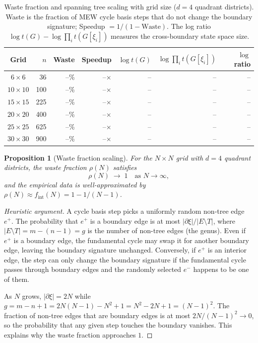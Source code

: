 \documentclass[11pt]{article}
\newtheorem{proposition}{Proposition}[section]
\begin{document}
\begin{table}[H]
\centering
\begin{tabular}{crrrrrr}
\toprule
Grid & $n$ & Waste & Speedup & $\log t(G)$ & $\log \prod_i t(G[\xi_i])$ & $\log$ ratio \\
\midrule
$6 \times 6$   &   36 & --\% &  --$\times$ &  -- & -- & -- \\
$10 \times 10$ &  100 & --\% &  --$\times$ &  -- & -- & -- \\
$15 \times 15$ &  225 & --\% &  --$\times$ &  -- & -- & -- \\
$20 \times 20$ &  400 & --\% &  --$\times$ &  -- & -- & -- \\
$25 \times 25$ &  625 & --\% &  --$\times$ &  -- & -- & -- \\
$30 \times 30$ &  900 & --\% &  --$\times$ &  -- & -- & -- \\
\bottomrule
\end{tabular}
\caption{Waste fraction and spanning tree scaling with grid size ($d = 4$ quadrant
districts). Waste is the fraction of MEW cycle basis steps that do not change the
boundary signature; Speedup $= 1/(1-\text{Waste})$. The log ratio
$\log t(G) - \log \prod_i t(G[\xi_i])$ measures the cross-boundary state space
size.}\label{tab:scaling}
\end{table}

\begin{proposition}[Waste fraction scaling]\label{prop:waste-scaling}
For the $N \times N$ grid with $d = 4$ quadrant districts, the waste fraction
$\rho(N)$ satisfies
\[
  \rho(N) \;\to\; 1 \quad \text{as } N \to \infty,
\]
and the empirical data is well-approximated by $\rho(N) \approx f_{\mathrm{int}}(N) = 1 - 1/(N-1)$.
\end{proposition}

\begin{proof}[Heuristic argument]
A cycle basis step picks a uniformly random non-tree edge $e^+$. The probability
that $e^+$ is a boundary edge is at most $|\partial\xi|/|E \setminus T|$, where
$|E \setminus T| = m - (n-1) = g$ is the number of non-tree edges (the genus).
Even if $e^+$ is a boundary edge, the fundamental cycle may swap it for another
boundary edge, leaving the boundary signature unchanged. Conversely, if $e^+$ is
an interior edge, the step can only change the boundary signature if the
fundamental cycle passes through boundary edges and the randomly selected
$e^-$ happens to be one of them.

As $N$ grows, $|\partial\xi| = 2N$ while $g = m - n + 1 = 2N(N-1) - N^2 + 1
= N^2 - 2N + 1 = (N-1)^2$. The fraction of non-tree edges that are boundary
edges is at most $2N/(N-1)^2 \to 0$, so the probability that any given step
touches the boundary vanishes. This explains why the waste fraction approaches
$1$.
\end{proof}
\end{document}
